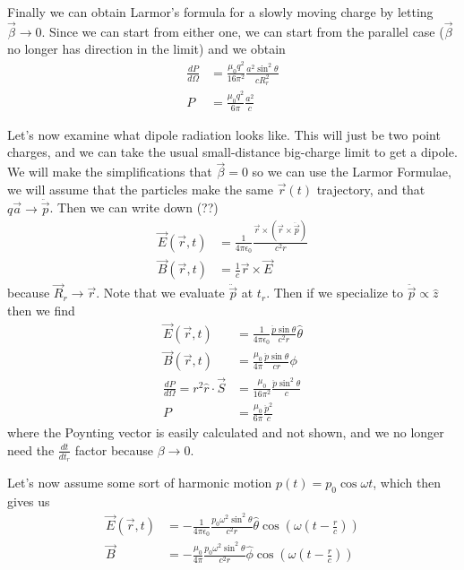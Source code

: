 \documentclass[10pt]{report}
\newcommand{\rd}[2]{\frac{d#1}{d#2}}
\begin{document}
Finally we can obtain Larmor's formula for a slowly moving charge by letting $\vec{\beta} \to 0$. Since we can start from either one, we can start from the parallel case ($\vec{\beta}$ no longer has direction in the limit) and we obtain
\begin{align}
    \rd{P}{\Omega} &= \frac{\mu_0q^2}{16\pi^2}\frac{a^2 \sin^2\theta}{cR_r^2}\\
    P &= \frac{\mu_0 q^2}{6\pi}\frac{a^2}{c}
\end{align}

Let's now examine what dipole radiation looks like. This will just be two point charges, and we can take the usual small-distance big-charge limit to get a dipole. We will make the simplifications that $\vec{\beta} = 0$ so we can use the Larmor Formulae, we will assume that the particles make the same $\vec{r}(t)$ trajectory, and that $q\vec{a} \to \ddot{\vec{p}}$. Then we can write down (??)
\begin{align}
    \vec{E}(\vec{r},t) &= \frac{1}{4\pi\epsilon_0}\frac{\vec{r} \times \left( \vec{r} \times \ddot{\vec{p}} \right)}{c^2r}\\
    \vec{B}(\vec{r},t) &= \frac{1}{c}\vec{r} \times \vec{E}\label{5.29.dipoles}
\end{align}
because $\vec{R}_r \to \vec{r}$. Note that we evaluate $\ddot{\vec{p}}$ at $t_r$. Then if we specialize to $\ddot{\vec{p}} \propto \hat{z}$ then we find
\begin{align}
    \vec{E}(\vec{r},t) &= \frac{1}{4\pi\epsilon_0}\frac{\ddot{p}\sin\theta}{c^2r}\hat{\theta}\\
    \vec{B}(\vec{r},t) &= \frac{\mu_0}{4\pi}\frac{\ddot{p}\sin\theta}{cr}\phi\\
    \rd{P}{\Omega} = r^2 \hat{r} \cdot \vec{S} &= \frac{\mu_0}{16 \pi^2}\frac{\ddot{p}\sin^2\theta}{c}\\
    P &= \frac{\mu_0}{6\pi}\frac{\ddot{p}^2}{c}
\end{align}
where the Poynting vector is easily calculated and not shown, and we no longer need the $\rd{t}{t_r}$ factor because $\beta \to 0$. 

Let's now assume some sort of harmonic motion $p(t) = p_0\cos \omega t$, which then gives us
\begin{align}
    \vec{E}(\vec{r},t) &= -\frac{1}{4\pi\epsilon_0}\frac{p_0\omega^2\sin^2\theta}{c^2r}\hat{\theta}\cos\left( \omega\left(t - \frac{r}{c}\right) \right)\\
    \vec{B} &= -\frac{\mu_0}{4\pi}\frac{p_0 \omega^2 \sin^2\theta}{c^2r}\hat{\phi}\cos\left( \omega\left( t - \frac{r}{c} \right) \right)
\end{align}
\end{document}

